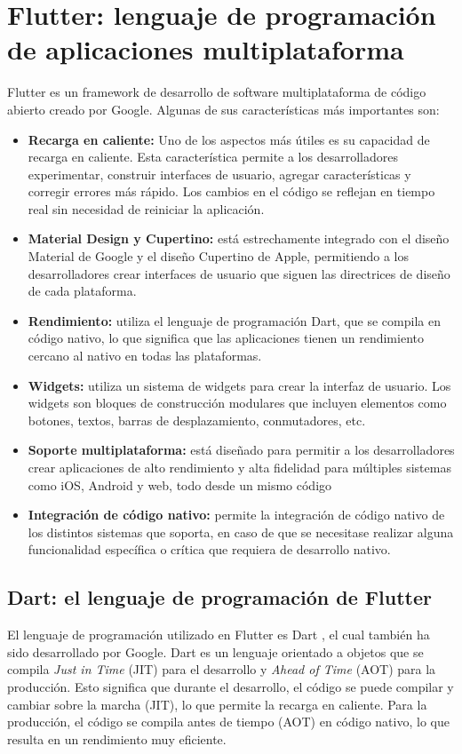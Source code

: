 \section{Flutter: lenguaje de programación de aplicaciones multiplataforma}
Flutter \cite{wiki:flutter} es un framework de desarrollo de software multiplataforma de código abierto creado por Google. Algunas de sus características más importantes son:
\begin{itemize}
    \item \textbf{Recarga en caliente:} Uno de los aspectos más útiles es su capacidad de recarga en caliente. Esta característica permite a los desarrolladores experimentar, construir interfaces de usuario, agregar características y corregir errores más rápido. Los cambios en el código se reflejan en tiempo real sin necesidad de reiniciar la aplicación. 
    \item \textbf{Material Design y Cupertino:} está estrechamente integrado con el diseño Material de Google y el diseño Cupertino de Apple, permitiendo a los desarrolladores crear interfaces de usuario que siguen las directrices de diseño de cada plataforma.   
    \item \textbf{Rendimiento:} utiliza el lenguaje de programación Dart, que se compila en código nativo, lo que significa que las aplicaciones tienen un rendimiento cercano al nativo en todas las plataformas.    
    \item \textbf{Widgets:} utiliza un sistema de widgets para crear la interfaz de usuario. Los widgets son bloques de construcción modulares que incluyen elementos como botones, textos, barras de desplazamiento, conmutadores, etc.  
    \item \textbf{Soporte multiplataforma:} está diseñado para permitir a los desarrolladores crear aplicaciones de alto rendimiento y alta fidelidad para múltiples sistemas como iOS, Android y web, todo desde un mismo código
    \item \textbf{Integración de código nativo:} permite la integración de código nativo de los distintos sistemas que soporta, en caso de que se necesitase realizar alguna funcionalidad específica o crítica que requiera de desarrollo nativo. 
\end{itemize}
    \subsection{Dart: el lenguaje de programación de Flutter}
    El lenguaje de programación utilizado en Flutter es Dart \cite{wiki:dart} , el cual también ha sido desarrollado por Google. Dart es un lenguaje orientado a objetos que se compila \textit{Just in Time} (JIT) para el desarrollo y \textit{Ahead of Time} (AOT) para la producción. Esto significa que durante el desarrollo, el código se puede compilar y cambiar sobre la marcha (JIT), lo que permite la recarga en caliente. Para la producción, el código se compila antes de tiempo (AOT) en código nativo, lo que resulta en un rendimiento muy eficiente.
    

